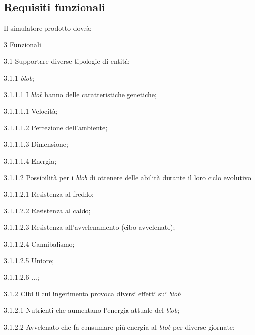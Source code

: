 \subsection{Requisiti funzionali}
Il simulatore prodotto dovrà:

\begin{myEnumerate}
    \item[3] Funzionali.
    \begin{myEnumerate}[label*=\arabic*.]
        \item[3.1] Supportare diverse tipologie di entità;
	\begin{myEnumerate}[label*=\arabic*.]
        	\item[3.1.1] \textit{blob};
		\begin{myEnumerate}[label*=\arabic*.]
        		\item[3.1.1.1] I \textit{blob} hanno delle caratteristiche genetiche;
			\begin{myEnumerate}[label*=\arabic*.]
        			\item[3.1.1.1.1] Velocità;
				\item[3.1.1.1.2] Percezione dell'ambiente;
				\item[3.1.1.1.3] Dimensione;
				\item[3.1.1.1.4] Energia;
    			\end{myEnumerate}
			\item[3.1.1.2] Possibilità per i \textit{blob} di ottenere delle abilità durante il loro ciclo evolutivo
			\begin{myEnumerate}[label*=\arabic*.]
        			\item[3.1.1.2.1] Resistenza al freddo;
				\item[3.1.1.2.2] Resistenza al caldo;
				\item[3.1.1.2.3] Resistenza all'avvelenamento (cibo avvelenato);
				\item[3.1.1.2.4] Cannibalismo;
				\item[3.1.1.2.5] Untore;
				\item[3.1.1.2.6] ...;
    			\end{myEnumerate}
    		\end{myEnumerate}
		\item[3.1.2] Cibi il cui ingerimento provoca diversi effetti sui \textit{blob}
		\begin{myEnumerate}[label*=\arabic*.]
        		\item[3.1.2.1] Nutrienti che aumentano l'energia attuale del \textit{blob};
			\item[3.1.2.2] Avvelenato che fa consumare più energia al \textit{blob} per diverse giornate;

\end{myEnumerate}
\end{myEnumerate}
\end{myEnumerate}
\end{myEnumerate}
